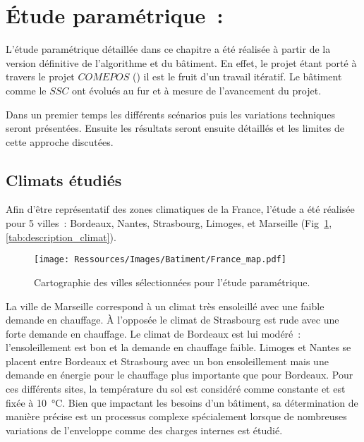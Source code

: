 \section{Étude paramétrique~:} %
\label{sec:etude_parametrique_}
L’étude paramétrique détaillée dans ce chapitre a été réalisée à partir de la
version définitive de l’algorithme et du bâtiment. En effet, le projet étant
porté à travers le projet $COMEPOS$ ()
il est le fruit d’un travail itératif. Le bâtiment comme le $SSC$ ont évolués au fur et à mesure
de l’avancement du projet.

Dans un premier temps les différents scénarios puis les variations techniques
seront présentées. Ensuite les résultats seront ensuite détaillés et les limites
de cette approche discutées.


\subsection{Climats étudiés} %
\label{sub:climats_etudies}
Afin d’être représentatif des zones climatiques de la France, l’étude a été réalisée
pour 5 villes~: Bordeaux, Nantes, Strasbourg, Limoges, et Marseille (Fig~\ref{fig:carte_france},
\autoref{tab:description_climat}).
\begin{figure}
    \begin{center}
        \texttt{[image: Ressources/Images/Batiment/France\_map.pdf]}
    \end{center}
    \caption{Cartographie des villes sélectionnées pour l’étude paramétrique.
             \label{fig:carte_france}}
\end{figure}
La ville de Marseille correspond à un climat très ensoleillé avec une faible demande en
chauffage. À l’opposée le climat de Strasbourg est rude avec
une forte demande en chauffage. Le climat de Bordeaux est lui modéré~: l’ensoleillement est bon
et la demande en chauffage faible. Limoges et Nantes se placent entre Bordeaux et
Strasbourg avec un bon ensoleillement mais une demande en énergie pour le chauffage plus
importante que pour Bordeaux. Pour ces différents sites, la température du sol est
considéré comme constante et est fixée à \SI{10}{\celsius}. Bien que impactant les besoins
d’un bâtiment, sa détermination de manière précise est un processus complexe spécialement
lorsque de nombreuses variations de l’enveloppe comme des charges internes est étudié.

